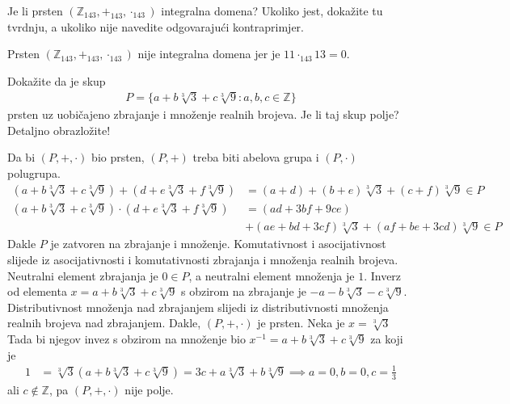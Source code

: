 \documentclass{exam}
\begin{document}
\begin{questions}
\question Je li prsten $(\mathbb{Z}_{143}, +_{143}, \cdot_{143})$ integralna domena? Ukoliko jest, dokažite tu tvrdnju, a ukoliko nije navedite odgovarajući kontraprimjer.

\begin{solution}
Prsten $(\mathbb{Z}_{143}, +_{143}, \cdot_{143})$ nije integralna domena jer je $11 \cdot_{143} 13 = 0$.
\end{solution}

\question Dokažite da je skup
\begin{align*}
P = \{a + b \sqrt[3]{3} + c \sqrt[3]{9}: a, b, c \in \mathbb{Z}\}
\end{align*}
prsten uz uobičajeno zbrajanje i množenje realnih brojeva. Je li taj skup polje? Detaljno obrazložite!

\begin{solution}
Da bi $(P, +, \cdot)$ bio prsten, $(P, +)$ treba biti abelova grupa i $(P, \cdot)$ polugrupa.
\begin{align*}
  (a + b \sqrt[3]{3} + c \sqrt[3]{9}) + (d + e \sqrt[3]{3} + f \sqrt[3]{9}) &= (a + d) + (b + e) \sqrt[3]{3} + (c + f) \sqrt[3]{9} \in P\\
  (a + b \sqrt[3]{3} + c \sqrt[3]{9}) \cdot (d + e \sqrt[3]{3} + f \sqrt[3]{9}) &= (ad + 3bf + 9ce)\\ &+ (ae + bd + 3cf) \sqrt[3]{3} + (af + be + 3cd) \sqrt[3]{9} \in P
\end{align*}
Dakle $P$ je zatvoren na zbrajanje i množenje. Komutativnost i asocijativnost slijede iz asocijativnosti i komutativnosti zbrajanja i množenja realnih brojeva. Neutralni element zbrajanja je $0 \in P$, a neutralni element množenja je $1$. Inverz od elementa $x = a + b \sqrt[3]{3} + c \sqrt[3]{9}$ s obzirom na zbrajanje je $-a - b \sqrt[3]{3} - c \sqrt[3]{9}$. Distributivnost množenja nad zbrajanjem slijedi iz distributivnosti množenja realnih brojeva nad zbrajanjem. Dakle, $(P, +, \cdot)$ je prsten.
Neka je $x = \sqrt[3]{3}$ Tada bi njegov invez s obzirom na množenje bio $x^{-1} = a + b \sqrt[3]{3} + c \sqrt[3]{9}$ za koji je
\begin{align*}
  1 &= \sqrt[3]{3} (a + b\sqrt[3]{3} + c\sqrt[3]{9}) = 3c + a\sqrt[3]{3} + b\sqrt[3]{9} \implies a = 0, b = 0, c = \frac{1}{3}
\end{align*}
ali $c \notin \mathbb{Z}$, pa $(P, +, \cdot)$ nije polje.
\end{solution}

\end{questions}
\end{document}
